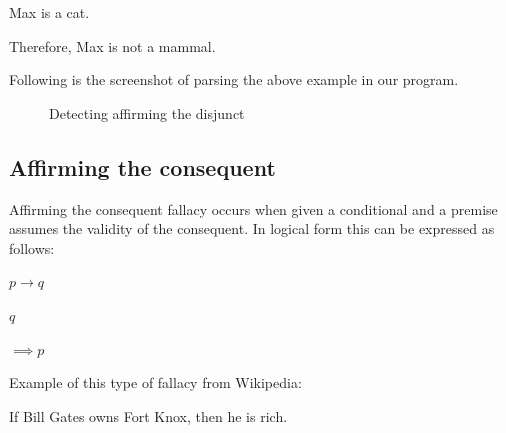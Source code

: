 \documentclass[english]{article}
\begin{document}
\begin{center}
Max is a cat.
\par\end{center}

\begin{center}
Therefore, Max is not a mammal.
\par\end{center}

Following is the screenshot of parsing the above example in our program.

\begin{figure}[htp]
 \caption{Detecting affirming the disjunct} \end{figure}


\subsection{Affirming the consequent}

Affirming the consequent fallacy occurs when given a conditional and
a premise assumes the validity of the consequent. In logical form
this can be expressed as follows:

\begin{center}
$p\to q$
\par\end{center}

\begin{center}
$q$
\par\end{center}

\begin{center}
$\implies p$
\par\end{center}

Example of this type of fallacy from Wikipedia: 

\begin{center}
If Bill Gates owns Fort Knox, then he is rich.
\par\end{center}
\end{document}
